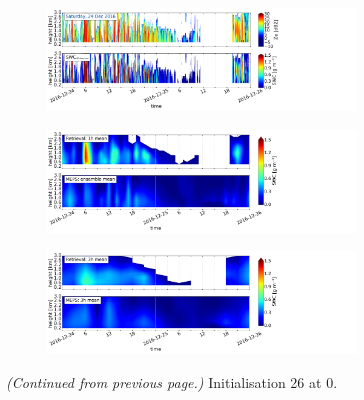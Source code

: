 \begin{figure}[H]\ContinuedFloat
	\centering
	\begin{subfigure}[t]{\textwidth}
		\centering
		\includegraphics[trim={0.cm 2.2cm 19.cm 0.5cm},clip,width=0.9\textwidth]{./fig_obs_ret/20161224}
		\caption{}\label{fig:SWC:ret_24}
	\end{subfigure}
	\begin{subfigure}[t]{\textwidth}
		\centering
		\includegraphics[trim={0.cm 2.2cm 19.cm 0.5cm},clip,width=0.9\textwidth]{./fig_vert_SWC_EM/20161224}
		\caption{}\label{fig:SWC_EM:24}
	\end{subfigure}
	\begin{subfigure}[t]{\textwidth}
		\centering
		\includegraphics[trim={0.cm 0.8cm 19.cm 0.5cm},clip,width=0.9\textwidth]{./fig_vert_SWC_3h/20161224}
		\caption{}\label{fig:SWC3h:24}
	\end{subfigure}
	\caption{\textit{(Continued from previous page.)} Initialisation \SI{26}{\dec} at \SI{0}{\UTC}.}
\end{figure}
